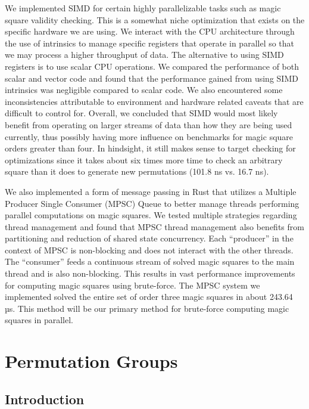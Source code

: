 \documentclass[12pt]{report}
\begin{document}
\par We implemented SIMD for certain highly parallelizable tasks such as magic square validity
checking. This is a somewhat niche optimization that exists on the specific hardware we are using.
We interact with the CPU architecture through the use of intrinsics to manage specific registers
that operate in parallel so that we may process a higher throughput of data. The alternative to
using SIMD registers is to use scalar CPU operations. We compared the performance of both scalar
and vector code and found that the performance gained from using SIMD intrinsics was negligible
compared to scalar code. We also encountered some inconsistencies attributable to environment and
hardware related caveats that are difficult to control for. Overall, we concluded that SIMD would
most likely benefit from operating on larger streams of data than how they are being used
currently, thus possibly having more influence on benchmarks for magic square orders greater than
four. In hindsight, it still makes sense to target checking for optimizations since it takes about
six times more time to check an arbitrary square than it does to generate new permutations (101.8
ns vs. 16.7 ns).

\par We also implemented a form of message passing in Rust that utilizes a Multiple Producer Single
Consumer (MPSC) Queue to better manage threads performing parallel computations on magic squares.
We tested multiple strategies regarding thread management and found that MPSC thread management
also benefits from partitioning and reduction of shared state concurrency. Each ``producer'' in the
context of MPSC is non-blocking and does not interact with the other threads. The ``consumer''
feeds a continuous stream of solved magic squares to the main thread and is also non-blocking. This
results in vast performance improvements for computing magic squares using brute-force. The MPSC
system we implemented solved the entire set of order three magic squares in about 243.64 µs. This
method will be our primary method for brute-force computing magic squares in parallel.

\chapter{Permutation Groups}

\section{Introduction}
\end{document}
